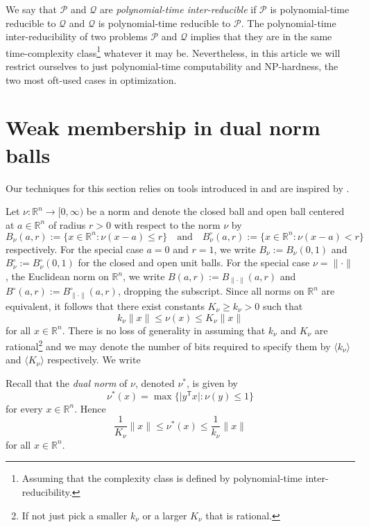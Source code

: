\documentclass[11pt,reqno]{amsart}
\theoremstyle{definition}
\theoremstyle{remark}
\begin{document}
We say that $\mathscr{P}$ and $\mathscr{Q}$ are \emph{polynomial-time inter-reducible} if $\mathscr{P}$ is polynomial-time reducible to $\mathscr{Q}$ and $\mathscr{Q}$ is polynomial-time reducible to $\mathscr{P}$.  The polynomial-time inter-reducibility of two problems $\mathscr{P}$ and $\mathscr{Q}$ implies that they are in the same time-complexity class\footnote{Assuming that the complexity class is defined by polynomial-time inter-reducibility.} whatever it may be. Nevertheless, in this article we will restrict ourselves to just polynomial-time computability and NP-hardness, the two most oft-used cases in optimization.

\section{Weak membership in dual norm balls}\label{sec:norm}

Our techniques for this section relies on tools introduced in \cite[Chapter 4]{GLS88} and are inspired by \cite[Section~6.1]{Gu02}.

Let $\nu:\mathbb{R}^n\to [0,\infty)$ be a norm and denote the closed ball and open ball centered at $a \in \mathbb{R}^n$ of radius $r > 0$ with respect to  the norm $\nu$ by
\[
B_\nu(a,r):=\{x\in \mathbb{R}^n : \nu(x-a)\le r\}\quad\text{and}\quad
B^\circ_\nu(a,r):=\{x\in \mathbb{R}^n : \nu(x-a) < r\}
\]
respectively. For the special case $a = 0$ and $r =1$, we write $B_\nu:=B_\nu(0,1)$ and  $B^\circ_\nu:=B^\circ_\nu(0,1)$  for the closed  and open unit balls.  
For the special case $\nu = \|\cdot\|$, the Euclidean norm on $\mathbb{R}^n$, we write $B(a,r):=B_{\|\cdot \|}(a,r)$ and  $B^\circ(a,r):=B^\circ_{\|\cdot \|}(a,r)$, dropping the subscript.
Since all norms on $\mathbb{R}^n$ are equivalent, it follows that there exist 
constants $K_\nu\ge k_\nu>0$ such that 
\begin{equation}\label{mnuequiv}
k_\nu\|x\|\le \nu(x)\le K_\nu\|x\|
\end{equation}
for all $x\in\mathbb{R}^{n}$. There is no loss of generality in assuming that $k_\nu$ and $K_\nu$ are rational\footnote{If not just pick a smaller $k_\nu$ or a larger $K_\nu$ that is rational.} and we may denote the number of bits required to specify them by $\langle k_\nu \rangle$ and $ \langle K_\nu \rangle$ respectively. We write 

Recall that the \emph{dual norm} of $\nu$, denoted $\nu^*$, is given by 
\[
\nu^*(x)=\max\{\lvert y^\mathsf{T} x \rvert : \nu(y)\le 1\}
\]
for every $x\in\mathbb{R}^{n}$. Hence
\begin{equation}\label{constdualnrm}
 \frac{1}{K_\nu}\|x\|\le \nu^*(x)\le \frac{1}{k_\nu}\|x\|
\end{equation}
for all  $x\in\mathbb{R}^{n}$.
\end{document}

